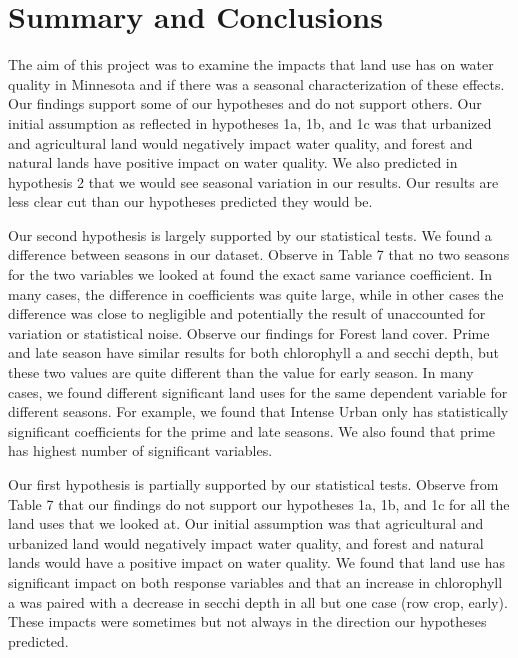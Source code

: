 \documentclass[12pt,]{article}
\begin{document}
\newpage

\hypertarget{summary-and-conclusions}{%
\section{Summary and Conclusions}\label{summary-and-conclusions}}

The aim of this project was to examine the impacts that land use has on
water quality in Minnesota and if there was a seasonal characterization
of these effects. Our findings support some of our hypotheses and do not
support others. Our initial assumption as reflected in hypotheses 1a,
1b, and 1c was that urbanized and agricultural land would negatively
impact water quality, and forest and natural lands have positive impact
on water quality. We also predicted in hypothesis 2 that we would see
seasonal variation in our results. Our results are less clear cut than
our hypotheses predicted they would be.

Our second hypothesis is largely supported by our statistical tests. We
found a difference between seasons in our dataset. Observe in Table 7
that no two seasons for the two variables we looked at found the exact
same variance coefficient. In many cases, the difference in coefficients
was quite large, while in other cases the difference was close to
negligible and potentially the result of unaccounted for variation or
statistical noise. Observe our findings for Forest land cover. Prime and
late season have similar results for both chlorophyll a and secchi
depth, but these two values are quite different than the value for early
season. In many cases, we found different significant land uses for the
same dependent variable for different seasons. For example, we found
that Intense Urban only has statistically significant coefficients for
the prime and late seasons. We also found that prime has highest number
of significant variables.

Our first hypothesis is partially supported by our statistical tests.
Observe from Table 7 that our findings do not support our hypotheses 1a,
1b, and 1c for all the land uses that we looked at. Our initial
assumption was that agricultural and urbanized land would negatively
impact water quality, and forest and natural lands would have a positive
impact on water quality. We found that land use has significant impact
on both response variables and that an increase in chlorophyll a was
paired with a decrease in secchi depth in all but one case (row crop,
early). These impacts were sometimes but not always in the direction our
hypotheses predicted.
\end{document}
